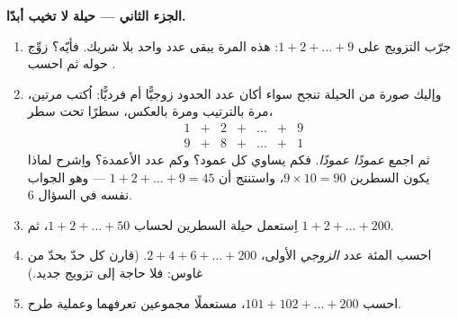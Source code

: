 \begin{problem}
\medskip
\noindent\textbf{الجزء الثاني --- حيلة لا تخيب أبدًا.}
\begin{enumerate}[resume]
  \item جرّب التزويج على $1 + 2 + \dots + 9$: هذه المرة يبقى عدد
        واحد بلا شريك. فأيّه؟ زوِّج حوله ثم
        احسب .
  \item وإليك صورة من الحيلة تنجح سواء أكان عدد الحدود
        زوجيًّا أم فرديًّا: اُكتب  مرتين، مرة
        بالترتيب ومرة بالعكس، سطرًا تحت سطر،
        \[
        \begin{array}{ccccccc}
        1 & + & 2 & + & \dots & + & 9 \\
        9 & + & 8 & + & \dots & + & 1
        \end{array}
        \]
        ثم اجمع \emph{عمودًا عمودًا}. فكم يساوي كل عمود؟
        وكم عدد الأعمدة؟ واِشرح لماذا يكون 
        السطرين $9 \times 10 = 90$، واستنتج أن
        $1 + 2 + \dots + 9 = 45$ --- وهو الجواب نفسه في
        السؤال 6.
  \item اِستعمل حيلة السطرين لحساب $1 + 2 + \dots + 50$،
        ثم $1 + 2 + \dots + 200$.
  \item احسب  المئة عدد \emph{الزوجي} الأولى،
        $2 + 4 + 6 + \dots + 200$. (قارن كل حدّ بحدّ
        من  غاوس: فلا حاجة إلى تزويج جديد.)
  \item احسب $101 + 102 + \dots + 200$، مستعملًا مجموعين
        تعرفهما وعملية طرح.
\end{enumerate}


\end{problem}
